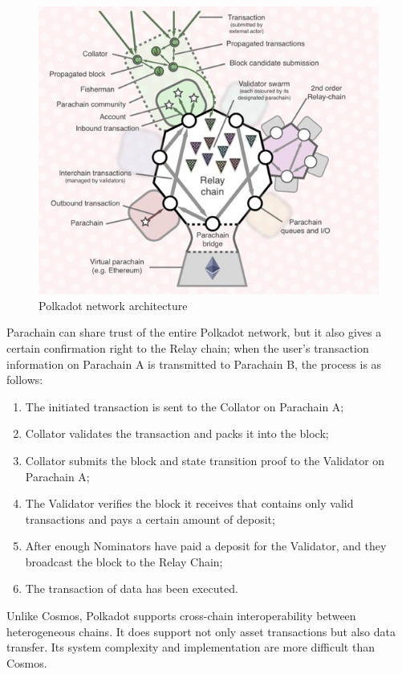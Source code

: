 \begin{figure}[H]
    \includegraphics[width=1\textwidth]{./figures/Polkadot.jpg}
    \centering
    \caption{Polkadot network architecture \protect\footnotemark}
    \centering
\end{figure}

\noindent Parachain can share trust of the entire Polkadot network, but it also gives a certain confirmation right to the Relay chain; when the user's transaction information on Parachain A is transmitted to Parachain B, the process is as follows:
\begin{enumerate}
    \item The initiated transaction is sent to the Collator on Parachain A;
    \item Collator validates the transaction and packs it into the block; 
    \item Collator submits the block and state transition proof to the Validator on Parachain A;
    \item The Validator verifies the block it receives that contains only valid transactions and pays a certain amount of deposit;
    \item  After enough Nominators have paid a deposit for the Validator, and they broadcast the block to the Relay Chain;
    \item The transaction of data has been executed.
\end{enumerate}
\noindent Unlike Cosmos, Polkadot supports cross-chain interoperability between heterogeneous chains. It does support not only asset transactions but also data transfer. Its system complexity and implementation are more difficult than Cosmos.


